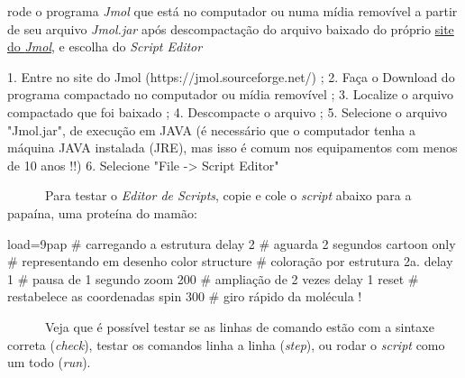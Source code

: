 \documentclass[
  letterpaper,
  DIV=11,
  numbers=noendperiod]{scrreprt}
\newenvironment{Shaded}{\begin{snugshade}}{\end{snugshade}}
\newcommand{\CommentTok}[1]{\textcolor[rgb]{0.37,0.37,0.37}{#1}}
\newcommand{\DecValTok}[1]{\textcolor[rgb]{0.68,0.00,0.00}{#1}}
\newcommand{\ErrorTok}[1]{\textcolor[rgb]{0.68,0.00,0.00}{#1}}
\newcommand{\FloatTok}[1]{\textcolor[rgb]{0.68,0.00,0.00}{#1}}
\newcommand{\FunctionTok}[1]{\textcolor[rgb]{0.28,0.35,0.67}{#1}}
\newcommand{\NormalTok}[1]{\textcolor[rgb]{0.00,0.23,0.31}{#1}}
\newcommand{\OtherTok}[1]{\textcolor[rgb]{0.00,0.23,0.31}{#1}}
\newcommand{\SpecialCharTok}[1]{\textcolor[rgb]{0.37,0.37,0.37}{#1}}
\newcommand{\StringTok}[1]{\textcolor[rgb]{0.13,0.47,0.30}{#1}}
\begin{document}
rode o programa \emph{Jmol} que está no computador ou numa mídia
removível a partir de seu arquivo \emph{Jmol.jar} após descompactação do
arquivo baixado do próprio \href{https://jmol.sourceforge.net/}{site do
\emph{Jmol}}, e escolha do \emph{Script Editor}

\begin{Shaded}
\begin{Highlighting}[]
\FloatTok{1.}\NormalTok{ Entre no site do }\FunctionTok{Jmol}\NormalTok{ (https}\SpecialCharTok{:}\ErrorTok{//}\NormalTok{jmol.sourceforge.net}\SpecialCharTok{/}\NormalTok{) ;}
\FloatTok{2.}\NormalTok{ Faça o Download do programa compactado no computador ou mídia removível ;}
\FloatTok{3.}\NormalTok{ Localize o arquivo compactado que foi baixado ;}
\FloatTok{4.}\NormalTok{ Descompacte o arquivo ;}
\FloatTok{5.}\NormalTok{ Selecione o arquivo }\StringTok{"Jmol.jar"}\NormalTok{, de execução em }\FunctionTok{JAVA}\NormalTok{ (é necessário que o computador tenha a máquina JAVA }\FunctionTok{instalada}\NormalTok{ (JRE), mas isso é comum nos equipamentos com menos de }\DecValTok{10}\NormalTok{ anos }\SpecialCharTok{!!}\NormalTok{)}
\FloatTok{6.}\NormalTok{ Selecione }\StringTok{"File {-}\textgreater{} Script Editor"} 
\end{Highlighting}
\end{Shaded}

~~~~~~Para testar o \emph{Editor de Scripts}, copie e cole o
\emph{script} abaixo para a papaína, uma proteína do mamão:

\begin{Shaded}
\begin{Highlighting}[]
\NormalTok{load}\OtherTok{=}\DecValTok{9}\NormalTok{pap  }\CommentTok{\# carregando a estrutura}
\NormalTok{delay }\DecValTok{2} \CommentTok{\# aguarda 2 segundos}
\NormalTok{cartoon only }\CommentTok{\# representando em desenho}
\NormalTok{color structure }\CommentTok{\# coloração por estrutura 2a.}
\NormalTok{delay }\DecValTok{1} \CommentTok{\# pausa de 1 segundo}
\NormalTok{zoom }\DecValTok{200} \CommentTok{\# ampliação de 2 vezes}
\NormalTok{delay }\DecValTok{1}
\NormalTok{reset }\CommentTok{\# restabelece as coordenadas}
\NormalTok{spin }\DecValTok{300} \CommentTok{\# giro rápido da molécula !}
\end{Highlighting}
\end{Shaded}

~~~~~~Veja que é possível testar se as linhas de comando estão com a
sintaxe correta (\emph{check}), testar os comandos linha a linha
(\emph{step}), ou rodar o \emph{script} como um todo (\emph{run}).
\end{document}
